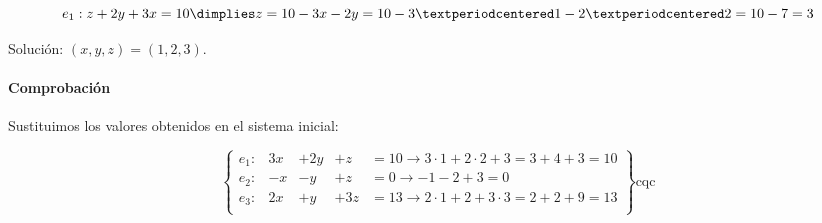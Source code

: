 \documentclass[palatino,nosec]{Docencia}
\begin{document}
\begin{problem}
\[
e_1: z+2y+3x = 10 \dimplies z = 10-3x-2y = 10-3·1-2·2 = 10-7 = 3
\]


Solución: $(x,y,z) = (1,2,3)$.

\paragraph*{Comprobación}

Sustituimos los valores obtenidos en el sistema inicial:


\[
\left\{\begin{array}{lccccl}
e_1: & 3x &+ 2y &+z &=10 \to 3·1+2·2+3 = 3+4+3 = 10  \\
e_2: & -x&-y&+z&=0 \to -1-2+3 = 0  \\
e_3: & 2x&+y&+3z&=13 \to 2·1+2+3·3 = 2+2+9 = 13  \\
\end{array}\right\} \text{cqc}
\]
\end{problem}
\end{document}
